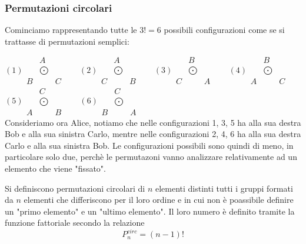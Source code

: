 \documentclass{article}     %
\begin{document}
            \subsubsection{Permutazioni circolari} 
            \begin{ex}
                
            
            Cominciamo rappresentando tutte le $3!=6$ possibili configurazioni come se si trattasse di permutazioni semplici:

            $(1) \begin{array}{ccc}
                &A\\
                &\bigodot \\
                B&&C
            \end{array}$~~~
            $(2)\begin{array}{ccc}
                &A\\
                &\bigodot \\
                C&&B
            \end{array}$~~~
            $(3)\begin{array}{ccc}
                &B\\
                &\bigodot \\
                C&&A
            \end{array}$~~~
            $(4)\begin{array}{ccc}
                &B\\
                &\bigodot \\
                A&&C
            \end{array}$~~~
            $(5)\begin{array}{ccc}
                &C\\
                &\bigodot \\
                A&&B
            \end{array}$~~~
            $(6)\begin{array}{ccc}
                &C\\
                &\bigodot \\
                B&&A
            \end{array}$\\
            Consideriamo ora Alice, notiamo che nelle configurazioni 1, 3, 5 ha alla sua destra Bob e alla sua sinistra Carlo, mentre nelle configurazioni 2, 4, 6 ha alla sua destra Carlo e alla sua sinistra Bob. Le configurazioni possibili sono quindi di meno, in particolare solo due, perchè le permutazoni vanno analizzare relativamente ad un elemento che viene "fissato". 
        \end{ex}
            \begin{boxdef}
                Si definiscono permutazioni circolari di $n$ elementi distinti tutti i gruppi formati da $n$ elementi che differiscono per il loro ordine e in cui non è poassibile definire un "primo elemento" e un "ultimo elemento". Il loro numero è definito tramite la funzione fattoriale secondo la relazione \[P_n^{circ}=(n-1)!\]
            \end{boxdef}
            
\end{document}
